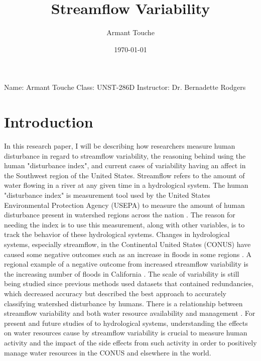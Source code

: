 \documentclass[a4paper,man,biblatex]{apa7}
\title{Streamflow Variability}
\author{Armant Touche}
\affiliation{Portland State University}
\date{\today}
\begin{document}
\noindent Name: Armant Touche\newline
\noindent Class: UNST-286D\newline
\noindent Instructor: Dr. Bernadette Rodgers\newline
\section{Introduction} 
\par In this research paper, I will be describing how researchers measure human disturbance in regard to streamflow variability, the reasoning behind  using the human "disturbance index", and current cases of variability having an affect in the Southwest region of the United States. Streamflow refers to the amount of water flowing in a river at any given time \autocite{streamflow_def} in a hydrological system. The human "disturbance index" is measurement tool used by the United States Environmental Protection Agency (USEPA) to measure the amount of human disturbance present in watershed regions across the nation \autocite{falcone_2016}. The reason for needing the index is to use this measurement, along with other variables, is to track the behavior of these hydrological systems. Changes in hydrological systems, especially streamflow, in the Continental United States (CONUS) have caused some negative outcomes such as an increase in floods in some regions \autocite{rice_2016}. A regional example of a negative outcome from increased streamflow variability is the increasing number of floods in California \autocite{standford_2020}. The scale of variability is still being studied since previous methods used datasets that contained redundancies, which decreased accuracy but \textcite{falcone_2016} described the best approach to accurately classifying watershed disturbance by humans. There is a relationship between streamflow variability and both water resource availability and management \autocite{rice_2016}. For present and future studies of to hydrological systems, understanding the effects on water resources cause by streamflow variability is crucial to measure human activity and the impact of the side effects from such activity in order to positively manage water resources in the CONUS and elsewhere in the world.\\
\end{document}

